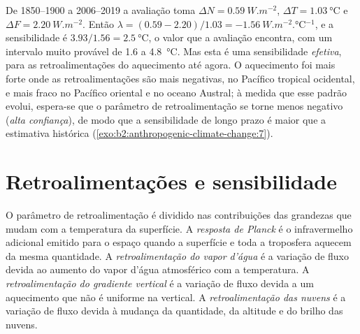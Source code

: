 De 1850--1900 a 2006--2019 a avaliação toma $\Delta N = \qty{0.59}{W.m^{-2}}$, $\Delta T =
\qty{1.03}{\celsius}$ e $\Delta F = \qty{2.20}{W.m^{-2}}$. Então $\lambda = (0.59 - 2.20)/1.03 =
\qty{-1.56}{W.m^{-2}.\celsius^{-1}}$, e a sensibilidade é $3.93/1.56 = \qty{2.5}{\celsius}$,
o valor que a avaliação encontra, com um intervalo muito provável de 1.6 a \qty{4.8}{\celsius}. Mas esta é
uma sensibilidade \emph{efetiva}, para as retroalimentações do aquecimento até agora. O aquecimento foi
mais forte onde as retroalimentações são mais negativas, no Pacífico tropical ocidental, e mais fraco no
Pacífico oriental e no oceano Austral; à medida que esse padrão evolui, espera-se que o parâmetro de retroalimentação
se torne menos negativo (\emph{alta confiança}), de modo que a sensibilidade de longo prazo é maior que a
estimativa histórica (\cref{exo:b2:anthropogenic-climate-change:7}).

\section{Retroalimentações e sensibilidade}\label{sec:b2:anthropogenic-climate-change:feedbacks}

\begin{definition}\label{def:b2:anthropogenic-climate-change:feedbacks}
O parâmetro de retroalimentação é dividido nas contribuições das grandezas que mudam com a
temperatura da superfície. A \emph{resposta de Planck} é o infravermelho adicional
emitido para o espaço quando a superfície e toda a troposfera aquecem da mesma quantidade. A
\emph{retroalimentação do vapor d'água} é a variação de fluxo devida ao aumento
do vapor d'água atmosférico com a temperatura. A \emph{retroalimentação do gradiente
vertical} é a variação de fluxo devida a um aquecimento que não é uniforme na vertical. A \emph{retroalimentação
das nuvens} é a variação de fluxo devida à mudança da quantidade, da altitude e do
brilho das nuvens.
\end{definition}

